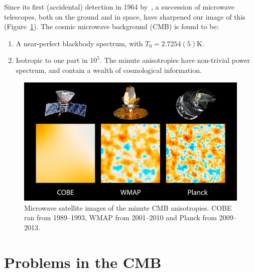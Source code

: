 Since its first (accidental) detection in 1964 by~\cite{PenziasWilson}, a succession of microwave telescopes, both on the ground and in space, have sharpened our image of this (Figure~\ref{fig:cos:satellites}).
The cosmic microwave background (CMB) is found to be:
\begin{enumerate}
  \item A near-perfect blackbody spectrum, with \(T_0=2.7254(5)\)K.
  \item Isotropic to one part in \(10^{5}\). The minute anisotropies have non-trivial power spectrum, and contain a wealth of cosmological information.
\end{enumerate}

\begin{figure}[tp]
  \centering
  \includegraphics[width=\textwidth]{chapters/inflationary_cosmology/figures/satellites}
  \caption{Microwave satellite images of the minute CMB anisotropies. COBE ran from 1989--1993, WMAP from 2001--2010 and Planck from 2009--2013.}\label{fig:cos:satellites}
\end{figure}

\section{Problems in the CMB}
